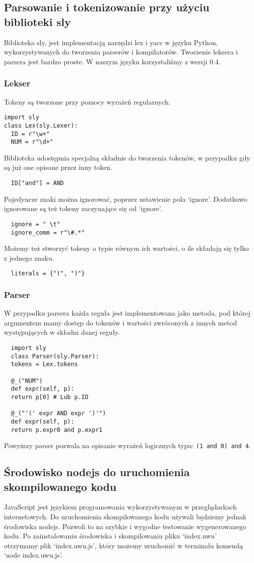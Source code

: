 \documentclass{article}
\begin{document}
\subsection{Parsowanie i tokenizowanie przy użyciu biblioteki sly}
Biblioteka sly, jest implementacją narzędzi lex i yacc w języku Python, wykorzystywanych do tworzenia parserów i kompilatorów. Tworzenie leksera i parsera jest bardzo proste.
W naszym języku korzystaliśmy z wersji 0.4.

\subsubsection{Lekser}
Tokeny są tworzone przy pomocy wyrażeń regularnych.
\begin{lstlisting}
import sly
class Lex(sly.Lexer):
  ID = r"\w+"
  NUM = r"\d+"
\end{lstlisting}
Biblioteka udostępnia specjalną składnie do tworzenia tokenów, w przypadku gdy są już one opisane przez inny token.
\begin{lstlisting}
  ID["and"] = AND
\end{lstlisting}
Pojedyncze znaki można ignorować, poprzez ustawienie pola `ignore'.
Dodatkowo ignorowane są też tokeny zaczynające się od `ignore'.
\begin{lstlisting}
  ignore = " \t"
  ignore_comm = r"\#.*"
\end{lstlisting}
Możemy też stworzyć tokeny o typie równym ich wartości, o ile składają się tylko z jednego znaku.
\begin{lstlisting}
  literals = {"(", ")"}
\end{lstlisting}

\subsubsection{Parser}
W przypadku parsera każda reguła jest implementowana jako metoda, pod której argumentem mamy dostęp do tokenów i wartości zwróconych z innych metod występujących w składni danej reguły.
\begin{lstlisting}
  import sly
  class Parser(sly.Parser):
  tokens = Lex.tokens
  
  @_("NUM")
  def expr(self, p):
  return p[0] # Lub p.ID
  
  @_("'(' expr AND expr ')'")
  def expr(self, p):
  return p.expr0 and p.expr1
\end{lstlisting}
Powyższy parser pozwala na opisanie wyrażeń logicznych typu: \lstinline{(1 and 0) and 4}.
\subsection{Środowisko nodejs do uruchomienia skompilowanego kodu}
JavaScript jest językiem programowania wykorzystywanym w przeglądarkach internetowych. Do uruchomienia skompilowanego kodu używali będziemy jednak środowiska nodejs. Pozwoli to na szybkie i wygodne testowanie wygenerowanego kodu. Po zainstalowaniu środowiska i skompilowaniu pliku `index.uwu' otrzymamy plik `index.uwu.js', który możemy uruchomić w terminalu komendą `node index.uwu.js'.
\end{document}

